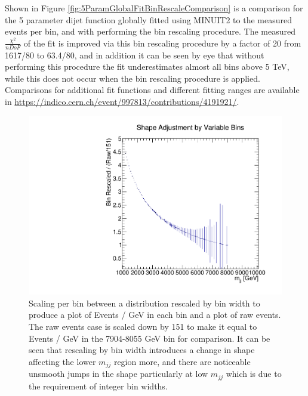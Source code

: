 Shown in Figure \ref{fig:5ParamGlobalFitBinRescaleComparison} is a comparison for the 5 parameter dijet function globally fitted using MINUIT2 to the measured events per bin, and with performing the bin rescaling procedure. The measured $\frac{\chi^{2}}{nDoF}$ of the fit is improved via this bin rescaling procedure by a factor of 20 from 1617/80 to 63.4/80, and in addition it can be seen by eye that without performing this procedure the fit underestimates almost all bins above 5 TeV, while this does not occur when the bin rescaling procedure is applied. Comparisons for additional fit functions and different fitting ranges are available in {\href{https://indico.cern.ch/event/997813/contributions/4191921/attachments/2178521/3679266/dijet_CompareBinRescale_26_01_2021.pdf}{https://indico.cern.ch/event/997813/contributions/4191921/}}.


\begin{figure}
    \centering
    \includegraphics[trim=3 8 35 48, clip,width=1.0\linewidth]{figures/app-GlobalFitStudies/BinningShapeAdjustment.pdf}
    \caption{Scaling per bin between a distribution rescaled by bin width to produce a plot of Events / GeV in each bin and a plot of raw events. The raw events case is scaled down by 151 to make it equal to Events / GeV in the 7904-8055 GeV bin for comparison. It can be seen that rescaling by bin width introduces a change in shape affecting the lower $m_{jj}$ region more, and there are noticeable unsmooth jumps in the shape particularly at low $m_{jj}$ which is due to the requirement of integer bin widths.}
    \label{fig:BinningShapeAdjustment}
\end{figure}



